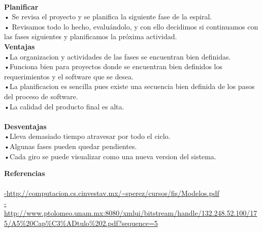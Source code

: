 \documentclass{article}
\begin{document}
 \\ \textbf{Planificar }
\\ • Se revisa el proyecto y se planifica la siguiente fase de la espiral.
 \\• Revisamos todo lo hecho, evaluándolo, y con ello decidimos si continuamos con las fases siguientes y planificamos la próxima
 actividad.\\ 
 
\vspace{8cm}
\textbf{Ventajas}
\\•La organizacion y actividades de las fases se encuentran bien definidas.
\\•Funciona bien para proyectos donde se encuentran bien definidos los requerimientos y el software que se desea.
\\•La planificacion es sencilla pues existe una secuencia bien 
definida de los pasos del proceso de software.
\\•La calidad del producto final es alta.\\ \\
\textbf{Desventajas}
\\•Lleva demasiado tiempo atravesar por todo el ciclo.
\\•Algunas fases pueden quedar pendientes.
\\•Cada giro se puede visualizar como una nueva version del 
sistema.\vspace{4cm}




\huge \textbf {Referencias} \\ \\ 
 \large\url{-http://computacion.cs.cinvestav.mx/~sperez/cursos/fis/Modelos.pdf}\\
\url{-http://www.ptolomeo.unam.mx:8080/xmlui/bitstream/handle/132.248.52.100/175/A5%20Cap%C3%ADtulo%202.pdf?sequence=5}\\
\end{document}
